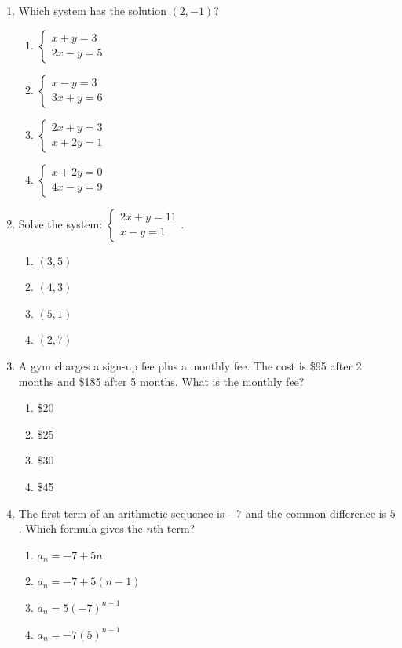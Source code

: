 \documentclass[11pt]{article}
\begin{document}
\begin{enumerate}
\item Which system has the solution $(2,-1)$?
\begin{enumerate}[label=(\Alph*)]
\item $\begin{cases}x+y=3\\2x-y=5\end{cases}$ \item $\begin{cases}x-y=3\\3x+y=6\end{cases}$
\item $\begin{cases}2x+y=3\\x+2y=1\end{cases}$ \item $\begin{cases}x+2y=0\\4x-y=9\end{cases}$
\end{enumerate}

\item Solve the system: $\begin{cases}2x+y=11\\x-y=1\end{cases}$.
\begin{enumerate}[label=(\Alph*)]
\item $(3,5)$ \item $(4,3)$ \item $(5,1)$ \item $(2,7)$
\end{enumerate}

\item A gym charges a sign-up fee plus a monthly fee. The cost is \$95 after 2 months and \$185 after 5 months. What is the monthly fee?
\begin{enumerate}[label=(\Alph*)]
\item \$20 \item \$25 \item \$30 \item \$45
\end{enumerate}

\item The first term of an arithmetic sequence is $-7$ and the common difference is $5$. Which formula gives the $n$th term?
\begin{enumerate}[label=(\Alph*)]
\item $a_n=-7+5n$ \item $a_n=-7+5(n-1)$ \item $a_n=5(-7)^{n-1}$ \item $a_n=-7(5)^{n-1}$
\end{enumerate}


\end{enumerate}
\end{document}
